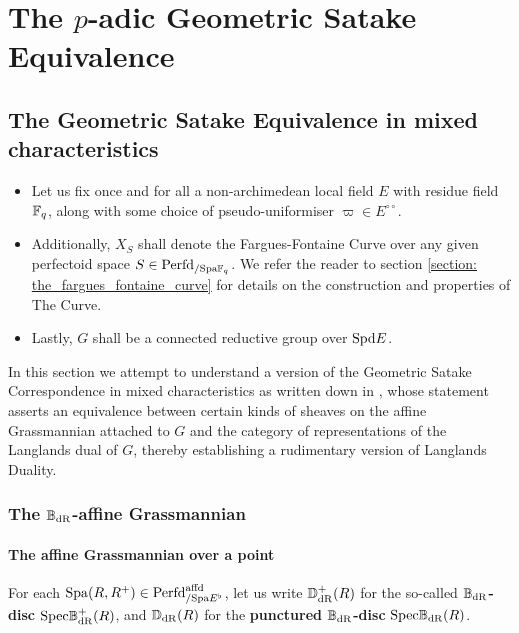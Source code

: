 \chapter{The \texorpdfstring{$p$}{}-adic Geometric Satake Equivalence}
    \begin{abstract}
        
    \end{abstract}
    
    \minitoc
    
    \section{The Geometric Satake Equivalence in mixed characteristics}
        \begin{convention} \label{conv: p_adic_geometric_satake_conventions}
            \noindent
            \begin{itemize}
                \item Let us fix once and for all a non-archimedean local field $E$ with residue field $\mathbb{F}_q$, along with some choice of pseudo-uniformiser $\varpi \in E^{\circ \circ}$. 
                \item Additionally, $X_S$ shall denote the Fargues-Fontaine Curve over any given perfectoid space $S \in \mathrm{Perfd}_{/\mathrm{Spa} \mathbb{F}_q}$. We refer the reader to section \ref{section: the_fargues_fontaine_curve} for details on the construction and properties of The Curve. 
                \item Lastly, $G$ shall be a connected reductive group over $\mathrm{Spd} E$.
            \end{itemize}
        \end{convention}
        
        In this section we attempt to understand a version of the Geometric Satake Correspondence in mixed characteristics as written down in \cite{fargues_scholze_geometrization_of_local_langlands}, whose statement asserts an equivalence between certain kinds of sheaves on the affine Grassmannian attached to $G$ and the category of representations of the Langlands dual of $G$, thereby establishing a rudimentary version of Langlands Duality. 
    
        \subsection{The \texorpdfstring{$\B_{\dR}$}{}-affine Grassmannian}
            \subsubsection{The affine Grassmannian over a point}
                \begin{convention}[$\B_{\dR}$-discs]
                    For each $\mathrm{Spa}(R, R^+) \in \mathrm{Perfd}^{\mathrm{affd}}_{/\mathrm{Spa} E^{\flat}}$, let us write $\mathbb{D}_{\mathrm{dR}}^+(R)$ for the so-called \textbf{$\B_{\dR}$-disc} $\mathrm{Spec} \mathbb{B}^+_{\mathrm{dR}}(R)$, and $\mathbb{D}_{\mathrm{dR}}(R)$ for the \textbf{punctured $\B_{\dR}$-disc} $\mathrm{Spec} \mathbb{B}_{\mathrm{dR}}(R)$.
                \end{convention}
            
